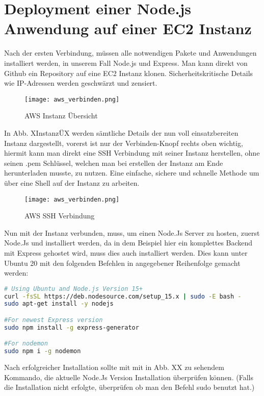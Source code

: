 \section{Deployment einer Node.js Anwendung auf einer EC2 Instanz}
Nach der ersten Verbindung, müssen alle notwendigen Pakete und Anwendungen installiert werden, in unserem Fall Node.js und Express. Man kann direkt von Github ein Repository auf eine EC2 Instanz klonen. Sicherheitskritische Details wie IP-Adressen werden geschwärzt und zensiert.

\begin{center}
\begin{figure}[h]
    \centering
    \texttt{[image: aws\_verbinden.png]}
    \caption{AWS Instanz Übersicht}
\end{figure}
\end{center}

In Abb. XInstanzÜX werden sämtliche Details der nun voll einsatzbereiten Instanz dargestellt, vorerst ist nur der Verbinden-Knopf rechts oben wichtig, hiermit kann man direkt eine SSH Verbindung mit seiner Instanz herstellen, ohne seinen .pem Schlüssel, welchen man bei erstellen der Instanz am Ende herunterladen musste, zu nutzen. Eine einfache, sichere und schnelle Methode um über eine Shell auf der Instanz zu arbeiten.

\begin{center}
\begin{figure}[h]
    \centering
    \texttt{[image: aws\_verbinden.png]}
    \caption{AWS SSH Verbindung}
\end{figure}
\end{center}

Nun mit der Instanz verbunden, muss, um einen Node.Js Server zu hosten, zuerst Node.Js und installiert werden, da in dem Beispiel hier ein komplettes Backend mit Express gehostet wird, muss dies auch installiert werden. Dies kann unter Ubuntu 20 mit den folgenden Befehlen in angegebener Reihenfolge gemacht werden:

\begin{lstlisting}[language=bash]
# Using Ubuntu and Node.js Version 15+
curl -fsSL https://deb.nodesource.com/setup_15.x | sudo -E bash -
sudo apt-get install -y nodejs

#For newest Express version
sudo npm install -g express-generator

#For nodemon
sudo npm i -g nodemon
\end{lstlisting}

Nach erfolgreicher Installation sollte mit mit in Abb. XX zu sehendem Kommando, die aktuelle Node.Js Version Installation überprüfen können. (Falls die Installation nicht erfolgte, überprüfen ob man den Befehl sudo benutzt hat.)

